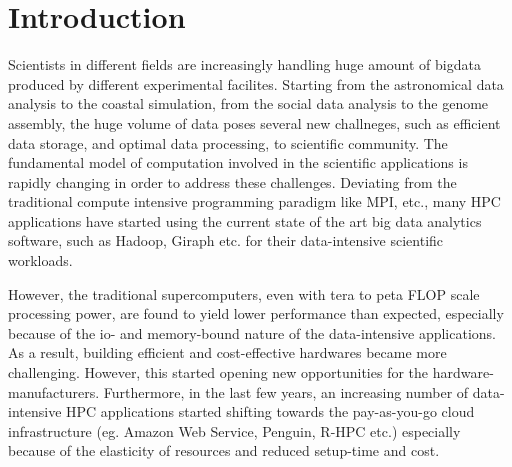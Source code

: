 \documentclass[conference]{IEEEtran}
\begin{document}


%
\IEEEpeerreviewmaketitle



\section {Introduction}
Scientists in different fields are increasingly handling huge amount of bigdata produced by different experimental facilites. %
Starting from the astronomical data analysis to the coastal simulation, from the social data analysis to the genome assembly, the huge volume of data poses several new challneges, such as efficient data storage, and optimal data processing, to scientific community. 
The fundamental model of computation involved in the scientific applications is rapidly changing in order to address these challenges.
Deviating from the traditional compute intensive programming paradigm like MPI, etc., many HPC applications have started using the current state of the art big data analytics software, such as Hadoop, Giraph etc. for their data-intensive scientific workloads. 

However, the traditional supercomputers, even with tera to peta FLOP scale processing power, are found to yield lower performance than expected, especially because of the io- and memory-bound nature of the data-intensive applications. 
As a result, building efficient and cost-effective hardwares became more challenging. However, this started opening new opportunities for the hardware-manufacturers. 
Furthermore, in the last few years, an increasing number of data-intensive HPC applications started shifting towards the pay-as-you-go cloud infrastructure (eg. Amazon Web Service, Penguin, R-HPC etc.) especially because of the elasticity of resources and reduced setup-time and cost. 
\end{document}
